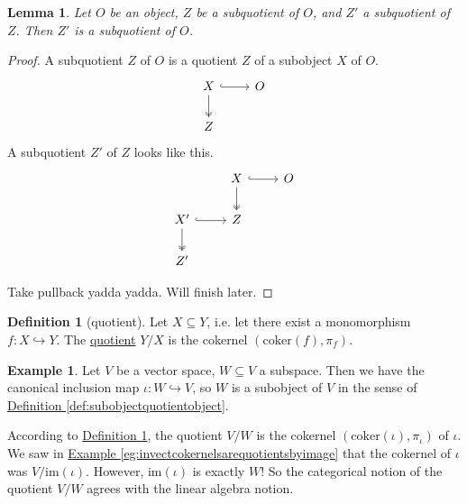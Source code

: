 \documentclass[a4paper]{report}
\newcommand{\defn}[1]{\ul{#1}}
\newcommand{\coker}{\mathrm{coker}}
\newcommand{\im}{\mathrm{im}}
\theoremstyle{definition}
\newtheorem{definition}{Definition}[section]
\newtheorem{example}{Example}[section]
\theoremstyle{plain}
\newtheorem{lemma}{Lemma}[section]
\theoremstyle{remark}
\begin{document}
\begin{lemma}
  Let $O$ be an object, $Z$ be a subquotient of $O$, and $Z'$ a subquotient of $Z$. Then $Z'$ is a subquotient of $O$.
\end{lemma}
\begin{proof}
  A subquotient $Z$ of $O$ is a quotient $Z$ of a subobject $X$ of $O$.
  \begin{equation*}
    \begin{tikzcd}
      X 
      \arrow[r, hookrightarrow]
      \arrow[d, twoheadrightarrow]
      & O
      \\
      Z
    \end{tikzcd}
  \end{equation*}
  A subquotient $Z'$ of $Z$ looks like this.
  \begin{equation*}
    \begin{tikzcd}
      & X
      \arrow[r, hookrightarrow]
      \arrow[d, twoheadrightarrow]
      & O
      \\
      X'
      \arrow[r, hookrightarrow]
      \arrow[d, twoheadrightarrow]
      & Z
      \\
      Z'
    \end{tikzcd}
  \end{equation*}

  Take pullback yadda yadda. Will finish later.
\end{proof}

\begin{definition}[quotient]
  \label{def:quotient}
  Let $X \subseteq Y$, i.e. let there exist a monomorphism $f\colon X \hookrightarrow Y$. The \defn{quotient} $Y/X$ is the cokernel $(\coker(f), \pi_{f})$.
\end{definition}

\begin{example}
  Let $V$ be a vector space, $W \subseteq V$ a subspace. Then we have the canonical inclusion map $\iota\colon W \hookrightarrow V$, so $W$ is a subobject of $V$ in the sense of \hyperref[def:subobjectquotientobject]{Definition \ref*{def:subobjectquotientobject}}.

  According to \hyperref[def:quotient]{Definition \ref*{def:quotient}}, the quotient $V / W$ is the cokernel $(\coker(\iota), \pi_{\iota})$ of $\iota$. We saw in \hyperref[eg:invectcokernelsarequotientsbyimage]{Example \ref*{eg:invectcokernelsarequotientsbyimage}} that the cokernel of $\iota$ was $V / \im(\iota)$. However, $\im(\iota)$ is exactly $W$! So the categorical notion of the quotient $V / W$ agrees with the linear algebra notion.
\end{example}
\end{document}
